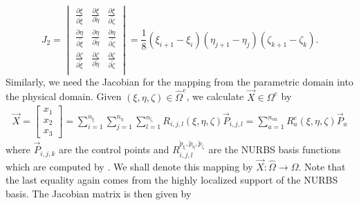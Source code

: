 \begin{equation*}
	J_2 = \begin{vmatrix}
		\frac{\partial \xi}{\partial\tilde{\xi}} & \frac{\partial \xi}{\partial\tilde{\eta}} & \frac{\partial \xi}{\partial\tilde{\zeta}}\\
		\frac{\partial \eta}{\partial\tilde{\xi}} & \frac{\partial \eta}{\partial\tilde{\eta}} & \frac{\partial \eta}{\partial\tilde{\zeta}}\\
		\frac{\partial \zeta}{\partial\tilde{\xi}} & \frac{\partial \zeta}{\partial\tilde{\eta}} & \frac{\partial \zeta}{\partial\tilde{\zeta}}\\
	\end{vmatrix}=\frac{1}{8}(\xi_{i+1}-\xi_i)(\eta_{j+1}-\eta_j)(\zeta_{k+1}-\zeta_k).
\end{equation*}
Similarly, we need the Jacobian for the mapping from the parametric domain into the physical domain. Given $(\xi,\eta,\zeta)\in \hat{\Omega}^e$, we calculate $\vec{X}\in \Omega^e$ by
\begin{align*}
\vec{X} =
	\begin{bmatrix}
	x_1\\
	x_2\\
	x_3
	\end{bmatrix} = 
	\sum_{i=1}^{n_\upxi}\sum_{j=1}^{n_\upeta}\sum_{l=1}^{n_\upzeta} R_{i,j,l}(\xi,\eta,\zeta) \vec{P}_{i,j,l} = \sum_{a=1}^{n_{\mathrm{en}}} R_a^e(\xi,\eta,\zeta) \vec{P}_a
\end{align*}
where $\vec{P}_{i,j,k}$ are the control points and $R_{i,j,l}^{\check{p}_\upxi,\check{p}_\upeta,\check{p}_\upzeta}$ are the NURBS basis functions which are computed by . We shall denote this mapping by $\vec{X}: \hat{\Omega} \rightarrow \Omega$. Note that the last equality again comes from the highly localized support of the NURBS basis. The Jacobian matrix is then given by
